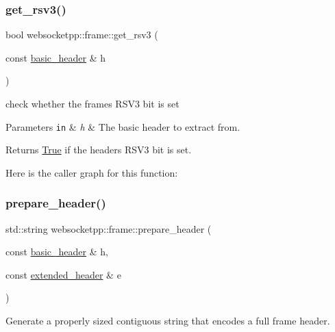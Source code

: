 \subsubsection{\texorpdfstring{get\+\_\+rsv3()}{get\_rsv3()}}
{\footnotesize\ttfamily bool websocketpp\+::frame\+::get\+\_\+rsv3 (\begin{DoxyParamCaption}\item[{const \mbox{\hyperlink{structwebsocketpp_1_1frame_1_1basic__header}{basic\+\_\+header}} \&}]{h }\end{DoxyParamCaption})\hspace{0.3cm}{\ttfamily [inline]}}



check whether the frame\textquotesingle{}s R\+S\+V3 bit is set 


\begin{DoxyParams}[1]{Parameters}
\mbox{\tt in}  & {\em h} & The basic header to extract from. \\
\hline
\end{DoxyParams}
\begin{DoxyReturn}{Returns}
\mbox{\hyperlink{struct_true}{True}} if the header\textquotesingle{}s R\+S\+V3 bit is set. 
\end{DoxyReturn}
Here is the caller graph for this function\+:
\mbox{\label{namespacewebsocketpp_1_1frame_ae63c3e01399a6787ed09b710853344a4}} 
\subsubsection{\texorpdfstring{prepare\+\_\+header()}{prepare\_header()}}
{\footnotesize\ttfamily std\+::string websocketpp\+::frame\+::prepare\+\_\+header (\begin{DoxyParamCaption}\item[{const \mbox{\hyperlink{structwebsocketpp_1_1frame_1_1basic__header}{basic\+\_\+header}} \&}]{h,  }\item[{const \mbox{\hyperlink{structwebsocketpp_1_1frame_1_1extended__header}{extended\+\_\+header}} \&}]{e }\end{DoxyParamCaption})\hspace{0.3cm}{\ttfamily [inline]}}



Generate a properly sized contiguous string that encodes a full frame header. 

